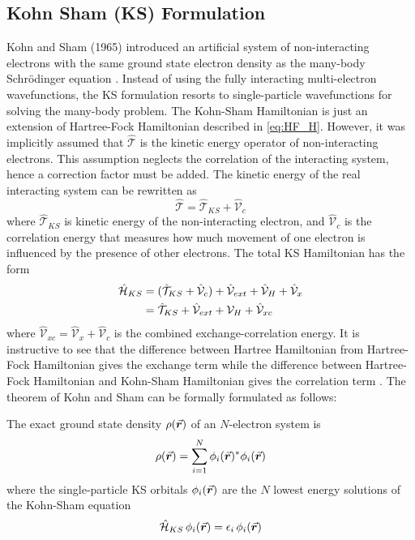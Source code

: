    \subsection{Kohn Sham (KS) Formulation}
    Kohn and Sham (1965) introduced an artificial system of non-interacting electrons with the same ground state electron density as the many-body Schr\"{o}dinger equation \citep{Kohn1965}. Instead of using the fully interacting multi-electron wavefunctions, the KS formulation resorts to single-particle wavefunctions for solving the many-body problem. The Kohn-Sham Hamiltonian is just an extension of Hartree-Fock Hamiltonian described in \eqref{eq:HF_H}. However, it was implicitly assumed that $\hat{\mathcal{T}}$ is the  kinetic energy operator of non-interacting electrons. This assumption neglects the correlation of the interacting system, hence a correction factor must be added. The kinetic energy of the real interacting system can be rewritten as 
    \begin{equation}
        \hat{\mathcal{T}} = \hat{\mathcal{T}}_{KS} +  \hat{\mathcal{V}}_c
    \end{equation}
    where $\hat{\mathcal{T}}_{KS}$ is kinetic energy of the non-interacting electron, and $\hat{\mathcal{V}}_c$ is the correlation energy that measures how much movement of one electron is influenced by the presence of other electrons. The total KS Hamiltonian has the form 
    \begin{align} \label{eq:HF_H}
        \hat{\mathcal{H}}_{KS}  &= (\hat{\mathcal{T}}_{KS} +  \hat{\mathcal{V}}_c)  + \hat{\mathcal{V}}_{ext} + \hat{\mathcal{V}}_H + \hat{\mathcal{V}}_x \notag \\
        &= \hat{\mathcal{T}}_{KS} + \hat{\mathcal{V}}_{ext} +{\mathcal{V}}_H + \hat{\mathcal{V}}_{xc}
    \end{align}
    where $\hat{\mathcal{V}}_{xc} = \hat{\mathcal{V}}_{x} + \hat{\mathcal{V}}_{c}$ is the combined exchange-correlation energy.  It is instructive to see that the difference between Hartree Hamiltonian from Hartree-Fock Hamiltonian gives the exchange term while the difference between Hartree-Fock Hamiltonian and Kohn-Sham Hamiltonian gives the correlation term \citep{Cottenier2002}. The theorem of Kohn and Sham can be formally formulated as follows:

    The exact ground state density $\rho({\va*{r}})$ of an $N$-electron system is 
\begin{equation} \label{eq:charge_dens}
\rho({\va*{r}}) = \sum_{i=1}^N \phi_i(\va*{r})^* \phi_i(\va*{r}) 
\end{equation}
where the single-particle KS orbitals $\phi_i(\va*{r})$ are the $N$ lowest energy solutions of the Kohn-Sham equation
\begin{equation}\label{eq:KS}
    \hat{\mathcal{H}}_{KS}\, \phi_i(\va*{r}) = \epsilon_i\, \phi_i(\va*{r})
\end{equation}
